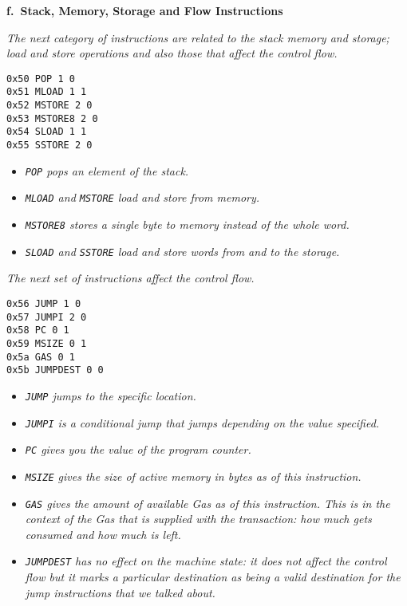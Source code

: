 \hfill\break
\textbf{f.~Stack, Memory, Storage and Flow Instructions}

\emph{The next category of instructions are related to the stack memory
and storage; load and store operations and also those that affect the
control flow.}

\begin{lstlisting}[language=Solidity,numbers=none]
0x50 POP 1 0
0x51 MLOAD 1 1
0x52 MSTORE 2 0
0x53 MSTORE8 2 0
0x54 SLOAD 1 1
0x55 SSTORE 2 0
\end{lstlisting}

\begin{itemize}
\tightlist
\item
  \emph{\texttt{POP} pops an element of the stack.}
\item
  \emph{\texttt{MLOAD} and \texttt{MSTORE} load and store from memory.}
\item
  \emph{\texttt{MSTORE8} stores a single byte to memory instead of the
  whole word.}
\item
  \emph{\texttt{SLOAD} and \texttt{SSTORE} load and store words from and
  to the storage.}
\end{itemize}

\emph{The next set of instructions affect the control flow.}

\begin{lstlisting}[language=Solidity,numbers=none]
0x56 JUMP 1 0
0x57 JUMPI 2 0
0x58 PC 0 1
0x59 MSIZE 0 1
0x5a GAS 0 1
0x5b JUMPDEST 0 0
\end{lstlisting}

\begin{itemize}
\tightlist
\item
  \emph{\texttt{JUMP} jumps to the specific location.}
\item
  \emph{\texttt{JUMPI} is a conditional jump that jumps depending on the
  value specified.}
\item
  \emph{\texttt{PC} gives you the value of the program counter.}
\item
  \emph{\texttt{MSIZE} gives the size of active memory in bytes as of
  this instruction.}
\item
  \emph{\texttt{GAS} gives the amount of available Gas as of this
  instruction. This is in the context of the Gas that is supplied with
  the transaction: how much gets consumed and how much is left.}
\item
  \emph{\texttt{JUMPDEST} has no effect on the machine state: it does
  not affect the control flow but it marks a particular destination as
  being a valid destination for the jump instructions that we talked
  about.}
\end{itemize}

